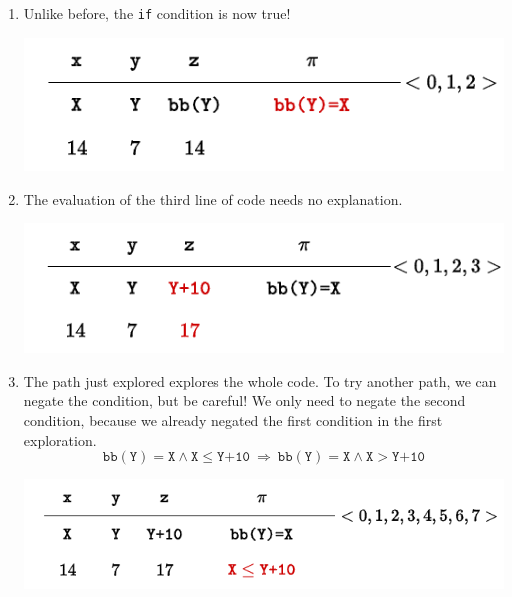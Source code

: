 \begin{examplebox}
\begin{enumerate}
        \item Unlike before, the \texttt{if} condition is now true!
        \begin{center}
            \includegraphics[width=.6\textwidth]{img/concolic-execution-6.pdf}
        \end{center}

        \item The evaluation of the third line of code needs no explanation.
        \begin{center}
            \includegraphics[width=.7\textwidth]{img/concolic-execution-7.pdf}
        \end{center}

        \item The path just explored explores the whole code. To try another path, we can negate the condition, but be careful! We only need to negate the second condition, because we already negated the first condition in the first exploration.
        \begin{equation*}
            \texttt{bb}\left(\texttt{Y}\right) = \texttt{X} \land \texttt{X} \le \texttt{Y+10} \: \Longrightarrow \: \texttt{bb}\left(\texttt{Y}\right) = \texttt{X} \land \texttt{X} > \texttt{Y+10}
        \end{equation*}
        \begin{center}
            \includegraphics[width=.8\textwidth]{img/concolic-execution-8.pdf}
        \end{center}
    \end{enumerate}

    \longline


\end{examplebox}
